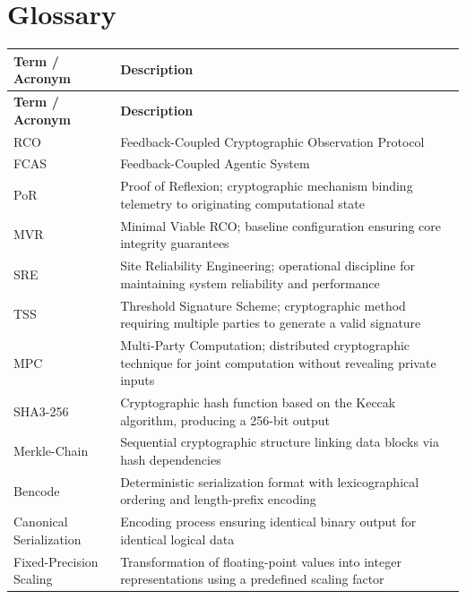 \chapter*{Glossary}

\begin{longtable}{p{4cm} p{10cm}}

\textbf{Term / Acronym} & \textbf{Description} \\ \hline

\endfirsthead
\textbf{Term / Acronym} & \textbf{Description} \\ \hline
\endhead

RCO & Feedback-Coupled Cryptographic Observation Protocol \\

FCAS & Feedback-Coupled Agentic System \\

PoR & Proof of Reflexion; cryptographic mechanism binding telemetry to originating computational state \\

MVR & Minimal Viable RCO; baseline configuration ensuring core integrity guarantees \\

SRE & Site Reliability Engineering; operational discipline for maintaining system reliability and performance \\

TSS & Threshold Signature Scheme; cryptographic method requiring multiple parties to generate a valid signature \\

MPC & Multi-Party Computation; distributed cryptographic technique for joint computation without revealing private inputs \\

SHA3-256 & Cryptographic hash function based on the Keccak algorithm, producing a 256-bit output \\

Merkle-Chain & Sequential cryptographic structure linking data blocks via hash dependencies \\

Bencode & Deterministic serialization format with lexicographical ordering and length-prefix encoding \\

Canonical Serialization & Encoding process ensuring identical binary output for identical logical data \\

Fixed-Precision Scaling & Transformation of floating-point values into integer representations using a predefined scaling factor \\


\end{longtable}
